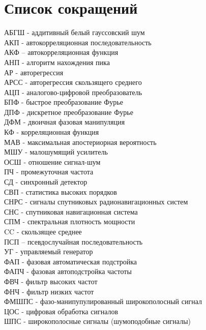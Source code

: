 \chapter*{Список сокращений}
\noindent
АБГШ - аддитивный белый гауссовский шум				\\
АКП - автокорреляционная последовательность			\\
АКФ – автокорреляционная функция				\\
АНП - алгоритм нахождения пика					\\
АР - авторегрессия						\\
АРСС - авторегрессия скользящего среднего			\\
АЦП - аналогово-цифровой преобразователь			\\
БПФ - быстрое преобразование Фурье				\\
ДПФ - дискретное преобразование Фурье				\\
ДФМ - двоичная фазовая манипуляция				\\
КФ - корреляционная функция					\\
МАВ - максимальная апостериорная вероятность			\\
МШУ - малошумящий усилитель					\\
ОСШ - отношение сигнал-шум 					\\
ПЧ - промежуточная частота					\\
СД - синхронный детектор					\\
СВП - статистика высоких порядков				\\
СНРС - сигналы спутниковых радионавигационных систем		\\
СНС - спутниковая навигационная система				\\
СПМ - спектральная плотность мощности				\\
CC - скользящее среднее						\\
ПСП – псевдослучайная последовательность			\\
УГ - управляемый генератор					\\
ФАП - фазовая автоматическая подстройка				\\
ФАПЧ - фазовая автоподстройка частоты				\\
ФВЧ - фильтр высоких частот					\\
ФНЧ - фильтр низких частот					\\
ФМШПС - фазо-манипупулированный широкополосный сигнал		\\
ЦОС - цифровая обработка сигналов				\\
ШПС -  широкополосные сигналы (шумоподобные сигналы)		\\


